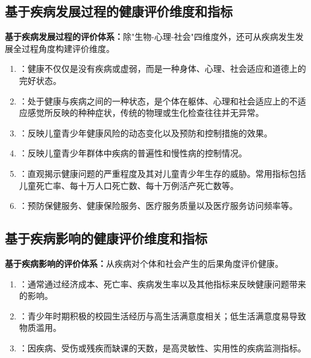 \subsection{基于疾病发展过程的健康评价维度和指标}

\begin{defbox}
\textbf{基于疾病发展过程的评价体系：}除"生物-心理-社会"四维度外，还可从疾病发生发展全过程角度构建评价维度。

\begin{enumerate}[leftmargin=*]
    \item {}：健康不仅仅是没有疾病或虚弱，而是一种身体、心理、社会适应和道德上的完好状态。
    \item {}：处于健康与疾病之间的一种状态，是个体在躯体、心理和社会适应上的不适应感觉所反映的种种症状，传统的物理或生化检查往往并无异常。
    \item {}：反映儿童青少年健康风险的动态变化以及预防和控制措施的效果。
    \item {}：反映儿童青少年群体中疾病的普遍性和慢性病的控制情况。
    \item {}：直观揭示健康问题的严重程度及其对儿童青少年生存的威胁。常用指标包括儿童死亡率、每十万人口死亡数、每十万例活产死亡数等。
    \item {}：预防保健服务、健康保险服务、医疗服务质量以及医疗服务访问频率等。
\end{enumerate}
\end{defbox}

\subsection{基于疾病影响的健康评价维度和指标}

\begin{defbox}
\textbf{基于疾病影响的评价体系：}从疾病对个体和社会产生的后果角度评价健康。

\begin{enumerate}[leftmargin=*]
    \item {}：通常通过经济成本、死亡率、疾病发生率以及其他指标来反映健康问题带来的影响。
    \item {}：青少年时期积极的校园生活经历与高生活满意度相关；低生活满意度易导致物质滥用。
    \item {}：因疾病、受伤或残疾而缺课的天数，是高灵敏性、实用性的疾病监测指标。
\end{enumerate}
\end{defbox}

